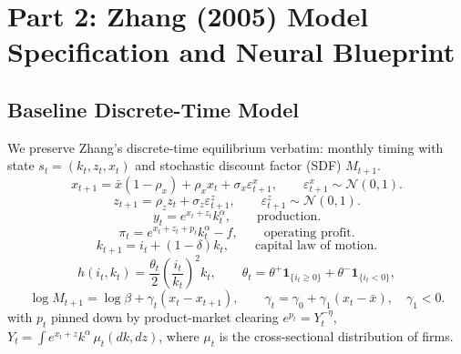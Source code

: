 \documentclass[11pt,a4paper]{article}
\numberwithin{equation}{section}
\begin{document}
\section{Part 2: Zhang (2005) Model Specification and Neural Blueprint}
\subsection{Baseline Discrete-Time Model}
\begin{assumptionbox}[title={Core Equations from Zhang (2005)}]
We preserve Zhang's discrete-time equilibrium verbatim: monthly timing with state \(s_t = (k_t, z_t, x_t)\) and stochastic discount factor (SDF) \(M_{t+1}\).
\begin{equation}
  x_{t+1} = \bar{x}(1-\rho_x) + \rho_x x_t + \sigma_x \varepsilon_{t+1}^x, \qquad \varepsilon_{t+1}^x \sim \mathcal N(0,1).
  \label{eq:agg_ar1}
\end{equation}
\begin{equation}
  z_{t+1} = \rho_z z_t + \sigma_z \varepsilon_{t+1}^z, \qquad \varepsilon_{t+1}^z \sim \mathcal N(0,1).
  \label{eq:idio_ar1}
\end{equation}
\begin{equation}
  y_t = e^{x_t + z_t} k_t^{\alpha}, \qquad \text{production}.
  \label{eq:production}
\end{equation}
\begin{equation}
  \pi_t = e^{x_t + z_t + p_t} k_t^{\alpha} - f, \qquad \text{operating profit}.
  \label{eq:profit}
\end{equation}
\begin{equation}
  k_{t+1} = i_t + (1-\delta) k_t, \qquad \text{capital law of motion}.
  \label{eq:capital}
\end{equation}
\begin{equation}
  h(i_t, k_t) = \frac{\theta_t}{2} \left( \frac{i_t}{k_t} \right)^2 k_t, \qquad \theta_t = \theta^+ \mathbf 1_{\{i_t \ge 0\}} + \theta^- \mathbf 1_{\{i_t < 0\}},
  \label{eq:adjustment}
\end{equation}
\begin{equation}
  \log M_{t+1} = \log \beta + \gamma_t (x_t - x_{t+1}), \qquad \gamma_t = \gamma_0 + \gamma_1 (x_t - \bar{x}), \quad \gamma_1 < 0.
  \label{eq:sdf_discrete}
\end{equation}
with \(p_t\) pinned down by product-market clearing \(e^{p_t} = Y_t^{ -\eta }\), \(Y_t = \int e^{x_t + z} k^{\alpha} \, \mu_t(dk, dz)\), where \(\mu_t\) is the cross-sectional distribution of firms.
\end{assumptionbox}
\end{document}
